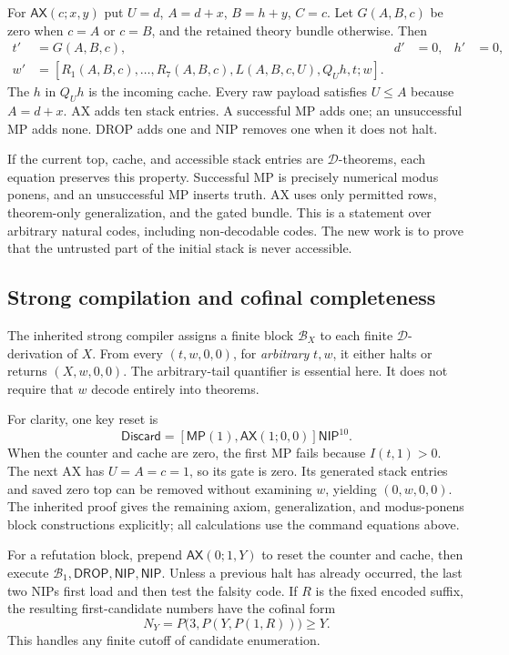\documentclass[11pt,letterpaper]{article}
\theoremstyle{definition}
\newcommand{\CalD}{\mathcal D}
\newcommand{\MP}{\mathsf{MP}}
\newcommand{\DROP}{\mathsf{DROP}}
\newcommand{\NIP}{\mathsf{NIP}}
\newcommand{\AX}{\mathsf{AX}}
\begin{document}
For $\AX(c;x,y)$ put $U=d$, $A=d+x$, $B=h+y$, $C=c$.
Let $G(A,B,c)$ be zero when $c=A$ or $c=B$, and the retained theory
bundle otherwise.  Then
\begin{align*}
 t'&=G(A,B,c),&d'&=0,&h'&=0,\\
 w'&=[R_1(A,B,c),\ldots,R_7(A,B,c),
       L(A,B,c,U),Q_Uh,t;w].
\end{align*}
The $h$ in $Q_Uh$ is the incoming cache.  Every raw payload satisfies
$U\le A$ because $A=d+x$.  AX adds ten stack entries.  A successful MP
adds one; an unsuccessful MP adds none.  DROP adds one and NIP removes
one when it does not halt.

If the current top, cache, and accessible stack entries are
$\CalD$-theorems, each equation preserves this property.  Successful
MP is precisely numerical modus ponens, and an unsuccessful MP inserts
truth.  AX uses only permitted rows, theorem-only generalization, and
the gated bundle.  This is a statement over arbitrary natural codes,
including non-decodable codes.  The new work is to prove that the
untrusted part of the initial stack is never accessible.

\subsection{Strong compilation and cofinal completeness}

The inherited strong compiler assigns a finite block $\mathcal B_X$ to
each finite $\CalD$-derivation of $X$.  From every $(t,w,0,0)$, for
\emph{arbitrary} $t,w$, it either halts or returns $(X,w,0,0)$.
The arbitrary-tail quantifier is essential here.  It does not require
that $w$ decode entirely into theorems.

For clarity, one key reset is
\[
 \mathsf{Discard}=[\MP(1),\AX(1;0,0)]\NIP^{10}.
\]
When the counter and cache are zero, the first MP fails because
$I(t,1)>0$.  The next AX has $U=A=c=1$, so its gate is zero.
Its generated stack entries and saved zero top can be removed without
examining $w$, yielding $(0,w,0,0)$.  The inherited proof gives the
remaining axiom, generalization, and modus-ponens block constructions
explicitly; all calculations use the command equations above.

For a refutation block, prepend $\AX(0;1,Y)$ to reset the counter and
cache, then execute $\mathcal B_1,\DROP,\NIP,\NIP$.  Unless a previous
halt has already occurred, the last two NIPs first load and then test
the falsity code.  If $R$ is the fixed encoded suffix, the resulting
first-candidate numbers have the cofinal form
\begin{equation}
 N_Y=P\bigl(3,P(Y,P(1,R))\bigr)\ge Y.
 \label{eq:cofinal}
\end{equation}
This handles any finite cutoff of candidate enumeration.
\end{document}
